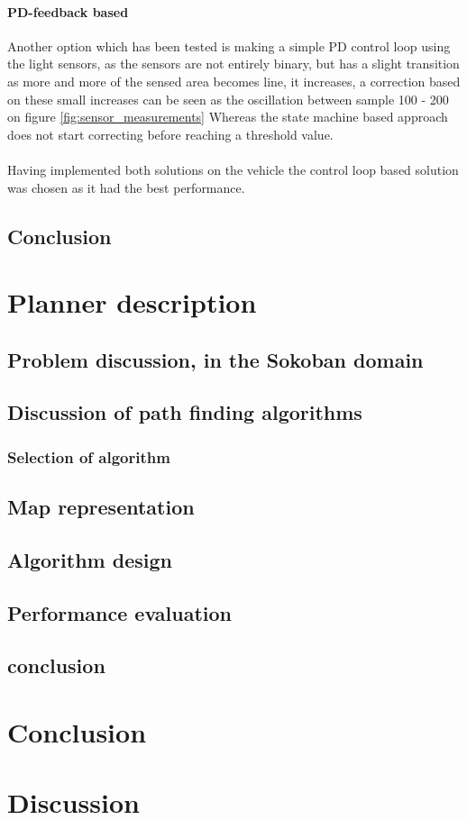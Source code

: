 \documentclass[draft, english, a4paper]{article}
\begin{document}
            \paragraph{PD-feedback based}
            Another option which has been tested is making a simple PD control loop
            using the light sensors, as the sensors are not entirely binary,
            but has a slight transition as more and more of the sensed area becomes
            line, it increases, a correction based on these small increases can 
            be seen as the oscillation between sample 100 - 200 on figure \ref{fig:sensor_measurements}
            Whereas the state machine based approach does not start correcting before reaching a threshold value.\\
            \\
            Having implemented both solutions on the vehicle the control loop based
            solution was chosen as it had the best performance.
	\subsection{Conclusion} %
\section{Planner description}
	\subsection{Problem discussion, in the Sokoban domain} %
	\subsection{Discussion of path finding algorithms} %
		\subsubsection{Selection of algorithm}
	\subsection{Map representation} %
	\subsection{Algorithm design}
	\subsection{Performance evaluation}
	\subsection{conclusion}
\section{Conclusion}
\section{Discussion}
\appendix
\end{document}
